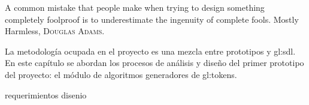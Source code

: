 %
%

{
  \epigrafe
  {%
    A common mistake that people make when trying to design something completely
    foolproof is to underestimate the ingenuity of complete fools.%
  }
  {%
    Mostly Harmless,
    \textsc{Douglas Adams}.%
  }
}

\noindent
La metodología ocupada en el proyecto es una mezcla entre prototipos y
\gls{gl:sdl}. En este capítulo se abordan los procesos de análisis y
diseño del primer prototipo del proyecto: el módulo de algoritmos
generadores de \glspl{gl:token}.

{requerimientos}
{disenio}
